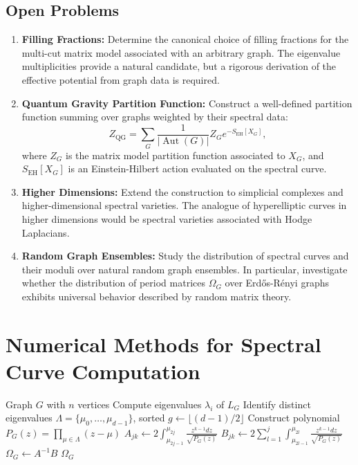\documentclass[12pt]{article}
\theoremstyle{definition}
\DeclareMathOperator{\Aut}{Aut}
\begin{document}
\subsection{Open Problems}
\begin{enumerate}
\item \textbf{Filling Fractions:} Determine the canonical choice of filling fractions for the multi-cut matrix model associated with an arbitrary graph. The eigenvalue multiplicities provide a natural candidate, but a rigorous derivation of the effective potential from graph data is required.
\item \textbf{Quantum Gravity Partition Function:} Construct a well-defined partition function summing over graphs weighted by their spectral data:
\[
Z_{\text{QG}} = \sum_{G} \frac{1}{|\Aut(G)|} Z_G e^{-S_{\text{EH}}[X_G]},
\]
where $Z_G$ is the matrix model partition function associated to $X_G$, and $S_{\text{EH}}[X_G]$ is an Einstein-Hilbert action evaluated on the spectral curve.
\item \textbf{Higher Dimensions:} Extend the construction to simplicial complexes and higher-dimensional spectral varieties. The analogue of hyperelliptic curves in higher dimensions would be spectral varieties associated with Hodge Laplacians.
\item \textbf{Random Graph Ensembles:} Study the distribution of spectral curves and their moduli over natural random graph ensembles. In particular, investigate whether the distribution of period matrices $\Omega_G$ over Erd\H{o}s-R\'enyi graphs exhibits universal behavior described by random matrix theory.
\end{enumerate}

\appendix
\section{Numerical Methods for Spectral Curve Computation}

\begin{algorithm}[H]
\caption{Compute Period Matrix of $X_G$}
\begin{algorithmic}[1]
\Require Graph $G$ with $n$ vertices
\State Compute eigenvalues $\lambda_i$ of $L_G$
\State Identify distinct eigenvalues $\Lambda = \{\mu_0, \dots, \mu_{d-1}\}$, sorted
\State $g \gets \lfloor (d-1)/2 \rfloor$
\State Construct polynomial $P_G(z) = \prod_{\mu \in \Lambda} (z - \mu)$
  \State $A_{jk} \gets 2 \int_{\mu_{2j-1}}^{\mu_{2j}} \frac{z^{k-1} dz}{\sqrt{P_G(z)}}$
  \State $B_{jk} \gets 2 \sum_{l=1}^j \int_{\mu_{2l-1}}^{\mu_{2l}} \frac{z^{k-1} dz}{\sqrt{P_G(z)}}$
 \EndFor
\EndFor
\State $\Omega_G \gets A^{-1} B$
\State \Return $\Omega_G$
\end{algorithmic}
\end{algorithm}
\end{document}

